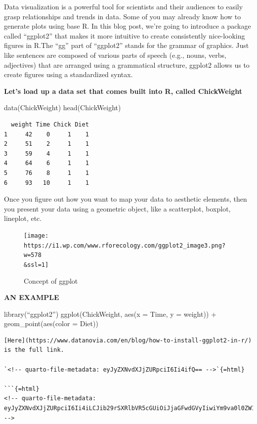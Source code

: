 \documentclass[
  letterpaper,
  DIV=11,
  numbers=noendperiod]{scrreprt}
\newenvironment{Shaded}{\begin{snugshade}}{\end{snugshade}}
\newcommand{\FunctionTok}[1]{\textcolor[rgb]{0.28,0.35,0.67}{#1}}
\newcommand{\NormalTok}[1]{\textcolor[rgb]{0.00,0.23,0.31}{#1}}
\begin{document}
Data visualization is a powerful tool for scientists and their audiences
to easily grasp relationships and trends in data. Some of you may
already know how to generate plots using base R. In this blog post,
we're going to introduce a package called ``ggplot2'' that makes it more
intuitive to create consistently nice-looking figures in R.The ``gg''
part of ``ggplot2'' stands for the grammar of graphics. Just like
sentences are composed of various parts of speech (e.g., nouns, verbs,
adjectives) that are arranged using a grammatical structure, ggplot2
allows us to create figures using a standardized syntax.

\textbf{Let's load up a data set that comes built into R, called
ChickWeight}

\begin{Shaded}
\begin{Highlighting}[]
\FunctionTok{data}\NormalTok{(ChickWeight)}
\FunctionTok{head}\NormalTok{(ChickWeight)}
\end{Highlighting}
\end{Shaded}

\begin{verbatim}
  weight Time Chick Diet
1     42    0     1    1
2     51    2     1    1
3     59    4     1    1
4     64    6     1    1
5     76    8     1    1
6     93   10     1    1
\end{verbatim}

Once you figure out how you want to map your data to aesthetic elements,
then you present your data using a geometric object, like a scatterplot,
boxplot, lineplot, etc.

\begin{figure}

{\centering \texttt{[image: https://i1.wp.com/www.rforecology.com/ggplot2\_image3.png?w=578\\\&ssl=1]}

}

\caption{Concept of ggplot}

\end{figure}

\textbf{AN EXAMPLE}

library(``ggplot2'') ggplot(ChickWeight, aes(x = Time, y = weight)) +
geom\_point(aes(color = Diet))

\begin{verbatim}
[Here](https://www.datanovia.com/en/blog/how-to-install-ggplot2-in-r/) is the full link.

`<!-- quarto-file-metadata: eyJyZXNvdXJjZURpciI6Ii4ifQ== -->`{=html}

```{=html}
<!-- quarto-file-metadata: eyJyZXNvdXJjZURpciI6Ii4iLCJib29rSXRlbVR5cGUiOiJjaGFwdGVyIiwiYm9va0l0ZW1OdW1iZXIiOjIsImJvb2tJdGVtRmlsZSI6ImFzc2lnbm1lbnQyLnFtZCIsImJvb2tJdGVtRGVwdGgiOjB9 -->
\end{verbatim}
\end{document}
